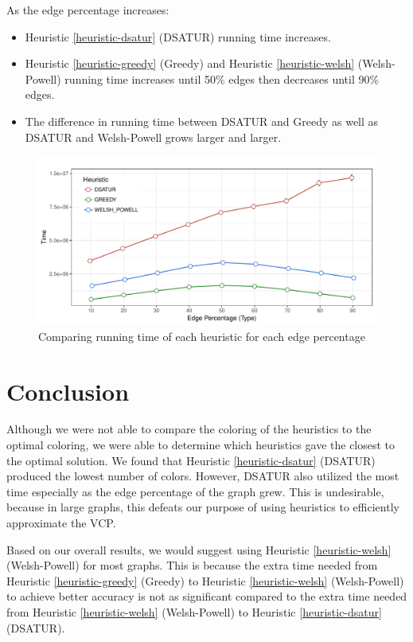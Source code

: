 \documentclass{article}
\newcounter{heuristic} \setcounter{heuristic}{0}
\theoremstyle{definition}
\begin{document}
\newpage

As the edge percentage increases:
\begin{itemize}
  \item Heuristic \ref{heuristic-dsatur} (DSATUR) running time increases.
  \item Heuristic \ref{heuristic-greedy} (Greedy) and Heuristic \ref{heuristic-welsh} (Welsh-Powell) running time increases until 50\% edges then decreases until 90\% edges.
  \item The difference in running time between DSATUR and Greedy as well as DSATUR and Welsh-Powell grows larger and larger.
\end{itemize}

\begin{figure}[H]
  \includegraphics[width=\linewidth]{../poster/figures/plot-time.pdf}
  \caption{Comparing running time of each heuristic for each edge percentage}\label{fig:compare-time}
\end{figure}

\section{Conclusion}
Although we were not able to compare the coloring of the heuristics to the optimal coloring, we were able to determine which heuristics gave the closest to the optimal solution. We found that Heuristic \ref{heuristic-dsatur} (DSATUR) produced the lowest number of colors. However, DSATUR also utilized the most time especially as the edge percentage of the graph grew. This is undesirable, because in large graphs, this defeats our purpose of using heuristics to efficiently approximate the VCP.

Based on our overall results, we would suggest using Heuristic \ref{heuristic-welsh} (Welsh-Powell) for most graphs. This is because the extra time needed from Heuristic \ref{heuristic-greedy} (Greedy) to Heuristic \ref{heuristic-welsh} (Welsh-Powell) to achieve better accuracy is not as significant compared to the extra time needed from Heuristic \ref{heuristic-welsh} (Welsh-Powell) to  Heuristic \ref{heuristic-dsatur} (DSATUR).



\newpage



\end{document}
